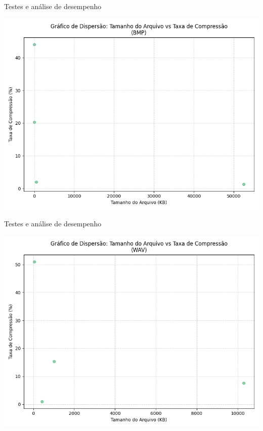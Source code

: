 \documentclass{beamer}
\begin{document}
\begin{frame}{Testes e análise de desempenho}
    \begin{center}
        \includegraphics[width=0.8\linewidth]{imagens/file_sizes_huffman0_bmp_scatter_plot}
    \end{center}
\end{frame}

\begin{frame}{Testes e análise de desempenho}
    \begin{center}
        \includegraphics[width=0.8\linewidth]{imagens/file_sizes_huffman0_wav_scatter_plot}
    \end{center}
\end{frame}
\end{document}
